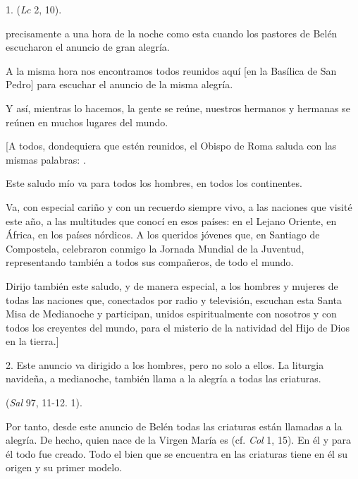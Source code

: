 \begin{body}
	1.  (\emph{Lc} 2, 10).
	
	 precisamente a una hora de la noche como esta cuando los pastores de Belén escucharon el anuncio de gran alegría.
	
	A la misma hora nos encontramos todos reunidos aquí {[}en la Basílica de San Pedro{]} para escuchar el anuncio de la misma alegría.
	
	Y así, mientras lo hacemos, la gente se reúne, nuestros hermanos y hermanas se reúnen en muchos lugares del mundo.
	
	{[}A todos, dondequiera que estén reunidos, el Obispo de Roma saluda con las mismas palabras: .
	
	Este saludo mío va para todos los hombres, en todos los continentes.
	
	Va, con especial cariño y con un recuerdo siempre vivo, a las naciones que visité este año, a las multitudes que conocí en esos países: en el Lejano Oriente, en África, en los países nórdicos. A los queridos jóvenes que, en Santiago de Compostela, celebraron conmigo la Jornada Mundial de la Juventud, representando también a todos sus compañeros, de todo el mundo.
	
	Dirijo también este saludo, y de manera especial, a los hombres y mujeres de todas las naciones que, conectados por radio y televisión, escuchan esta Santa Misa de Medianoche y participan, unidos espiritualmente con nosotros y con todos los creyentes del mundo, para el misterio de la natividad del Hijo de Dios en la tierra.{]}
	
	2. Este anuncio va dirigido a los hombres, pero no solo a ellos. La liturgia navideña, a medianoche, también llama a la alegría a todas las criaturas.
	
	 (\emph{Sal} 97, 11-12. 1).
	
	Por tanto, desde este anuncio de Belén todas las criaturas están llamadas a la alegría. De hecho, quien nace de la Virgen María es  (cf. \emph{Col} 1, 15). En él y para él todo fue creado. Todo el bien que se encuentra en las criaturas tiene en él su origen y su primer modelo.
	

\end{body}
